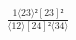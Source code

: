 \documentclass[varwidth, border=5pt]{standalone}
\begin{document}
\begin{my}
$\begin{gathered}
\scriptscriptstyle\frac{1⟨23⟩²[23]²}{⟨12⟩[24]²⟨34⟩}
\end{gathered}$
\end{my}
\end{document}

